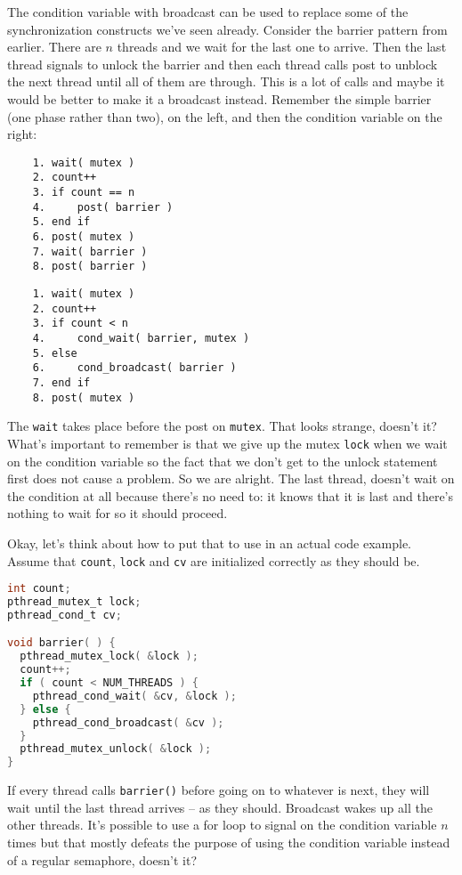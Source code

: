 The condition variable with broadcast can be used to replace some of the synchronization constructs we've seen already. Consider the barrier pattern from earlier. There are $n$ threads and we wait for the last one to arrive. Then the last thread signals to unlock the barrier and then each thread calls post to unblock the next thread until all of them are through. This is a lot of calls and maybe it would be better to make it a broadcast instead. Remember the simple barrier (one phase rather than two), on the left, and then the condition variable on the right:

\begin{multicols}{2}
  \begin{verbatim}
	1. wait( mutex )
	2. count++
	3. if count == n
	4.     post( barrier )
	5. end if
	6. post( mutex )
	7. wait( barrier )
	8. post( barrier )
  \end{verbatim}
\columnbreak
  \begin{verbatim}
	1. wait( mutex )
	2. count++
	3. if count < n
	4.     cond_wait( barrier, mutex )
	5. else 
	6.     cond_broadcast( barrier )
	7. end if
	8. post( mutex )
  \end{verbatim}
\end{multicols}

The \texttt{wait} takes place before the post on \texttt{mutex}. That looks strange, doesn't it? What's important to remember is that we give up the mutex \texttt{lock} when we wait on the condition variable so the fact that we don't get to the unlock statement first does not cause a problem. So we are alright. The last thread, doesn't wait on the condition at all because there's no need to: it knows that it is last and there's nothing to wait for so it should proceed.

Okay, let's think about how to put that to use in an actual code example. Assume that \texttt{count}, \texttt{lock} and \texttt{cv} are initialized correctly as they should be. 

\begin{lstlisting}[language=C]
int count;
pthread_mutex_t lock;
pthread_cond_t cv; 

void barrier( ) {
  pthread_mutex_lock( &lock );
  count++;
  if ( count < NUM_THREADS ) {
    pthread_cond_wait( &cv, &lock );
  } else {
    pthread_cond_broadcast( &cv );
  }
  pthread_mutex_unlock( &lock );
}
\end{lstlisting}

If every thread calls \texttt{barrier()} before going on to whatever is next, they will wait until the last thread arrives -- as they should. Broadcast wakes up all the other threads. It's possible to use a for loop to signal on the condition variable $n$ times but that mostly defeats the purpose of using the condition variable instead of a regular semaphore, doesn't it?

